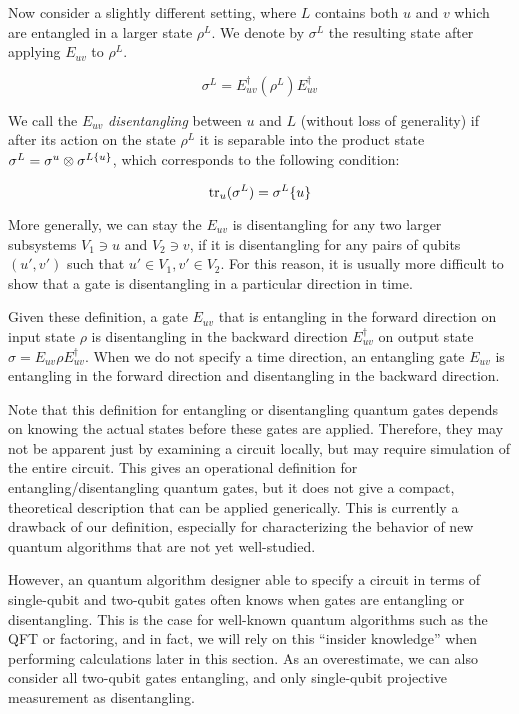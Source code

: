 Now consider a slightly different setting, where $L$ contains both $u$ and $v$
which are entangled in a larger state $\rho^{L}$. We denote by $\sigma^{L}$ the resulting
state after applying $E_{uv}$ to $\rho^{L}$.

\begin{equation}
\sigma^{L} = E^{\dagger}_{uv} (\rho^{L}) E^{\dagger}_{uv}
\end{equation}

We call the $E_{uv}$ \emph{disentangling} between $u$ and $L$ (without loss
of generality) if after its action on the state $\rho^{L}$ it is
separable into the product state $\sigma^{L} = \sigma^{u} \otimes \sigma^{L \\ \{u\}}$,
which corresponds to the following condition:

\begin{equation}
\text{tr}_{u}(\sigma^{L}) = \sigma^{L} \\ \{u\}
\end{equation}

More generally, we can stay the $E_{uv}$ is disentangling for any two
larger subsystems $V_1 \ni u$ and $V_2 \ni v$, if it is disentangling
for any pairs of qubits $(u',v')$ such that $u' \in V_1, v' \in V_2$. For this
reason, it is
usually more difficult to show that a gate is disentangling in a particular
direction in time.

Given these definition, a gate $E_{uv}$
that is entangling in the forward direction on input state $\rho$
is disentangling in the backward direction $E^{\dagger}_{uv}$ on output
state $\sigma = E_{uv}\rho E^{\dagger}_{uv}$. When we do not specify a
time direction, an entangling gate $E_{uv}$ is entangling in the forward
direction and disentangling in the backward direction.

Note that this definition for entangling or disentangling quantum gates
depends on knowing the actual states before these gates are applied.
Therefore, they may not be apparent just by examining a circuit locally,
but may require simulation of the entire circuit. This gives an operational
definition for entangling/disentangling quantum gates, but it does not give
a compact, theoretical description that can be applied generically. This is
currently a drawback of our definition, especially for characterizing the
behavior of new quantum algorithms that are not yet well-studied.

However, an quantum algorithm designer able to specify a circuit in terms of single-qubit and
two-qubit gates often knows when gates are entangling or disentangling. This is
the case for well-known quantum algorithms such as the QFT or factoring,
and in fact, we will rely on this ``insider knowledge'' when performing
calculations later in this section.
As an overestimate, we can also consider all two-qubit gates entangling, and
only single-qubit projective measurement as disentangling.

